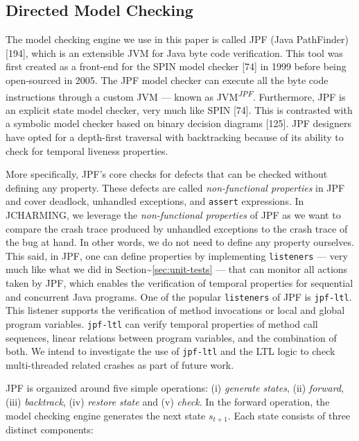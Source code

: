 \documentclass[12pt]{report}
\begin{document}
\subsection{Directed Model Checking}\label{directed-model-checking}

The model checking engine we use in this paper is called JPF (Java
PathFinder) {[}194{]}, which is an extensible JVM for Java byte code
verification. This tool was first created as a front-end for the SPIN
model checker {[}74{]} in 1999 before being open-sourced in 2005. The
JPF model checker can execute all the byte code instructions through a
custom JVM --- known as JVM\textsuperscript{\textit{JPF}}. Furthermore,
JPF is an explicit state model checker, very much like SPIN {[}74{]}.
This is contrasted with a symbolic model checker based on binary
decision diagrams {[}125{]}. JPF designers have opted for a depth-first
traversal with backtracking because of its ability to check for temporal
liveness properties.

More specifically, JPF's core checks for defects that can be checked
without defining any property. These defects are called
\textit{non-functional properties} in JPF and cover deadlock, unhandled
exceptions, and \texttt{assert} expressions. In JCHARMING, we leverage
the \textit{non-functional properties} of JPF as we want to compare the
crash trace produced by unhandled exceptions to the crash trace of the
bug at hand. In other words, we do not need to define any property
ourselves. This said, in JPF, one can define properties by implementing
\texttt{listeners} --- very much like what we did in
Section\textasciitilde{}\ref{sec:unit-tests} --- that can monitor all
actions taken by JPF, which enables the verification of temporal
properties for sequential and concurrent Java programs. One of the
popular \texttt{listeners} of JPF is \texttt{jpf-ltl}. This listener
supports the verification of method invocations or local and global
program variables. \texttt{jpf-ltl} can verify temporal properties of
method call sequences, linear relations between program variables, and
the combination of both. We intend to investigate the use of
\texttt{jpf-ltl} and the LTL logic to check multi-threaded related
crashes as part of future work.

JPF is organized around five simple operations: (i) \emph{generate
states}, (ii) \emph{forward}, (iii) \emph{backtrack}, (iv) \emph{restore
state} and (v) \emph{check}. In the forward operation, the model
checking engine generates the next state \(s_{t+1}\). Each state
consists of three distinct components:
\end{document}
